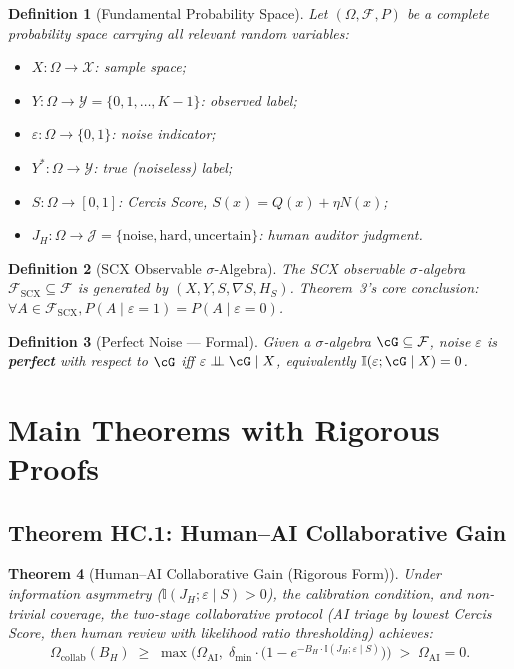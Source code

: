 \documentclass[12pt,a4paper]{article}
\newtheorem{theorem}{Theorem}[section]
\newtheorem{definition}[theorem]{Definition}
\newcommand{\I}{\mathbb{I}}
\newcommand{\cX}{\mathcal{X}}
\newcommand{\cY}{\mathcal{Y}}
\newcommand{\cF}{\mathcal{F}}
\newcommand{\cJ}{\mathcal{J}}
\begin{document}
\begin{definition}[Fundamental Probability Space]
\label{def:prob-space}
Let $(\Omega, \cF, P)$ be a complete probability space carrying all relevant random variables:
\begin{itemize}
    \item $X: \Omega \to \cX$: sample space;
    \item $Y: \Omega \to \cY = \{0,1,\dots,K-1\}$: observed label;
    \item $\varepsilon: \Omega \to \{0,1\}$: noise indicator;
    \item $Y^*: \Omega \to \cY$: true (noiseless) label;
    \item $S: \Omega \to [0,1]$: Cercis Score, $S(x) = Q(x) + \eta N(x)$;
    \item $J_H: \Omega \to \cJ = \{\text{noise}, \text{hard}, \text{uncertain}\}$: human auditor judgment.
\end{itemize}
\end{definition}

\begin{definition}[SCX Observable $\sigma$-Algebra]
\label{def:scx-sigma}
The SCX observable $\sigma$-algebra $\cF_{\mathrm{SCX}} \subseteq \cF$ is generated by $(X, Y, S, \nabla S, H_S)$. Theorem~3's core conclusion: $\forall A \in \cF_{\mathrm{SCX}}, P(A \mid \varepsilon=1) = P(A \mid \varepsilon=0)$.
\end{definition}

\begin{definition}[Perfect Noise --- Formal]
\label{def:perfect-noise-formal}
Given a $\sigma$-algebra $\cG \subseteq \cF$, noise $\varepsilon$ is \textbf{perfect} with respect to $\cG$ iff $\varepsilon \perp\!\!\!\perp \cG \mid X$, equivalently $\I(\varepsilon; \cG \mid X) = 0$.
\end{definition}

\section{Main Theorems with Rigorous Proofs}

\subsection{Theorem HC.1: Human--AI Collaborative Gain}

\begin{theorem}[Human--AI Collaborative Gain (Rigorous Form)]
\label{thm:collab-gain}
Under information asymmetry ($\I(J_H; \varepsilon \mid S) > 0$), the calibration condition, and non-trivial coverage, the two-stage collaborative protocol (AI triage by lowest Cercis Score, then human review with likelihood ratio thresholding) achieves:
\begin{equation}\label{eq:collab-gain-strict}
    \Omega_{\mathrm{collab}}(B_H) \;\geq\; \max\Big(
        \Omega_{\mathrm{AI}},\;
        \delta_{\min} \cdot \big(1 - e^{-B_H \cdot \I(J_H; \varepsilon \mid S)}\big)
    \Big) \;>\; \Omega_{\mathrm{AI}} = 0.
\end{equation}
\end{theorem}
\end{document}
